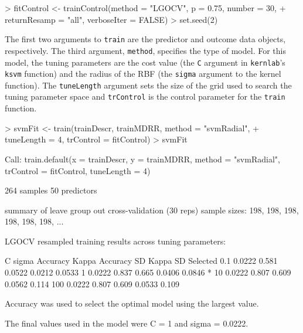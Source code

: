 \documentclass[12pt]{article}
\begin{document}
\begin{small}
\begin{Schunk}
\begin{Sinput}
> fitControl <- trainControl(method = "LGOCV", p = 0.75, number = 30, 
+     returnResamp = "all", verboseIter = FALSE)
> set.seed(2)
\end{Sinput}
\end{Schunk}
\end{small}


The first two arguments to \texttt{train} are the predictor and outcome data objects, respectively. The third argument, \texttt{method}, specifies the type of model. For this model, the tuning parameters are the cost value (the \texttt{C} argument in \texttt{kernlab}'s \texttt{ksvm} function) and the radius of the RBF (the \texttt{sigma} argument to the kernel function). The \texttt{tuneLength} argument sets the size of the grid used to search the tuning parameter space and \texttt{trControl} is the control parameter for the \texttt{train} function. 

\begin{small}
\begin{Schunk}
\begin{Sinput}
> svmFit <- train(trainDescr, trainMDRR, method = "svmRadial", 
+     tuneLength = 4, trControl = fitControl)
> svmFit
\end{Sinput}
\begin{Soutput}
Call:
train.default(x = trainDescr, y = trainMDRR, method = "svmRadial", 
    trControl = fitControl, tuneLength = 4)

264 samples
50 predictors

summary of leave group out cross-validation (30 reps) sample sizes:
    198, 198, 198, 198, 198, 198, ... 

LGOCV resampled training results across tuning parameters:

  C    sigma   Accuracy  Kappa   Accuracy SD  Kappa SD  Selected
  0.1  0.0222  0.581     0.0522  0.0212       0.0533            
  1    0.0222  0.837     0.665   0.0406       0.0846    *       
  10   0.0222  0.807     0.609   0.0562       0.114             
  100  0.0222  0.807     0.609   0.0533       0.109             

Accuracy was used to select the optimal model using the largest value.

The final values used in the model were C = 1 and sigma = 0.0222.
\end{Soutput}
\end{Schunk}
\end{small}
\end{document}
